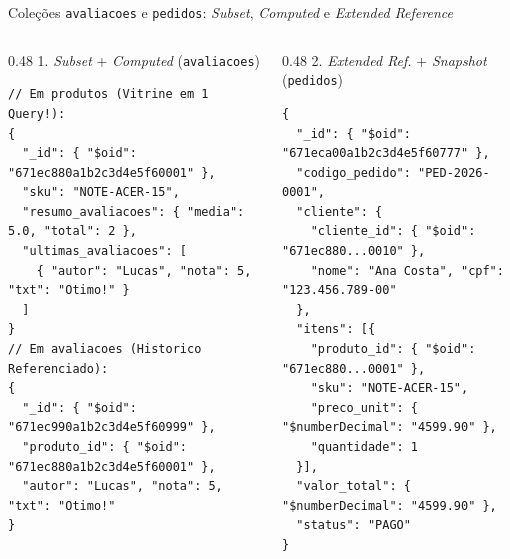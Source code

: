 \begin{frame}[fragile]{Coleções \texttt{avaliacoes} e \texttt{pedidos}: \textit{Subset}, \textit{Computed} e \textit{Extended Reference}}
  \vspace{0.02cm}
  \begin{columns}[t]
    \begin{column}{0.48\textwidth}
      \alert{1. \textit{Subset} + \textit{Computed} (\texttt{avaliacoes})}\par
      \begin{lstlisting}[language=mongosh]
// Em produtos (Vitrine em 1 Query!):
{
  "_id": { "$oid": "671ec880a1b2c3d4e5f60001" },
  "sku": "NOTE-ACER-15",
  "resumo_avaliacoes": { "media": 5.0, "total": 2 },
  "ultimas_avaliacoes": [
    { "autor": "Lucas", "nota": 5, "txt": "Otimo!" }
  ]
}
// Em avaliacoes (Historico Referenciado):
{
  "_id": { "$oid": "671ec990a1b2c3d4e5f60999" },
  "produto_id": { "$oid": "671ec880a1b2c3d4e5f60001" },
  "autor": "Lucas", "nota": 5, "txt": "Otimo!"
}
      \end{lstlisting}
    \end{column}
    \begin{column}{0.48\textwidth}
      \alert{2. \textit{Extended Ref.} + \textit{Snapshot} (\texttt{pedidos})}\par
      \begin{lstlisting}[language=mongosh]
{
  "_id": { "$oid": "671eca00a1b2c3d4e5f60777" },
  "codigo_pedido": "PED-2026-0001",
  "cliente": {
    "cliente_id": { "$oid": "671ec880...0010" },
    "nome": "Ana Costa", "cpf": "123.456.789-00"
  },
  "itens": [{
    "produto_id": { "$oid": "671ec880...0001" },
    "sku": "NOTE-ACER-15",
    "preco_unit": { "$numberDecimal": "4599.90" },
    "quantidade": 1
  }],
  "valor_total": { "$numberDecimal": "4599.90" },
  "status": "PAGO"
}
      \end{lstlisting}
    \end{column}
  \end{columns}
\end{frame}


